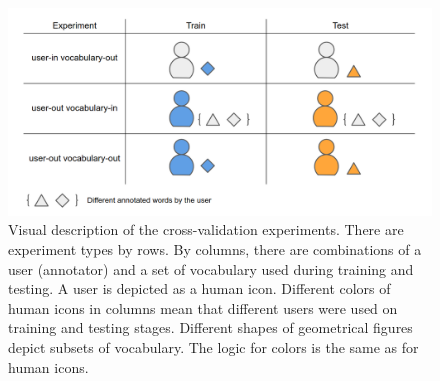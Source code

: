 \begin{figure}[h]
    \centering
    \includegraphics[width=14cm]{Images/Experiments.png}
    \caption{Visual description of the cross-validation experiments. There are experiment types by rows. By columns, there are combinations of a user (annotator) and a set of vocabulary used during training and testing. A user is depicted as a human icon. Different colors of human icons in columns mean that different users were used on training and testing stages. Different shapes of geometrical figures depict subsets of vocabulary. The logic for colors is the same as for human icons.}
    \label{fig:experiments-description}
\end{figure} 

